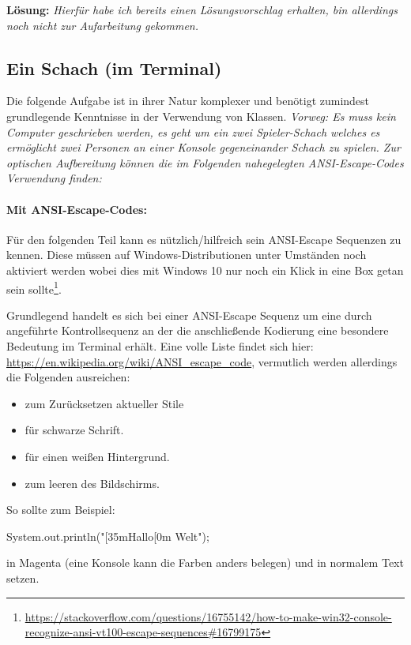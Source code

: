 \documentclass[table]{sopra-base}
\makeatletter
\newenvironment{solution}{\null\par\noindent\textbf{\textcolor{sob@col@uulm@cs}{Lösung:}}\newline\bgroup\color{black}\slshape\ignorespaces}{\egroup}
\makeatother
\begin{document}
\begin{solution}
    Hierfür habe ich bereits einen Lösungsvorschlag erhalten, bin allerdings noch nicht zur Aufarbeitung gekommen.
\end{solution}

\subsection{Ein Schach (im Terminal)}
Die folgende Aufgabe ist in ihrer Natur komplexer und benötigt zumindest grundlegende Kenntnisse in der Verwendung von Klassen. \textit{Vorweg: Es muss kein Computer geschrieben
werden, es geht um ein zwei Spieler-Schach welches es ermöglicht zwei Personen an einer
Konsole gegeneinander Schach zu spielen. Zur optischen Aufbereitung können die im Folgenden nahegelegten ANSI-Escape-Codes Verwendung finden:}\par
\paragraph{Mit ANSI-Escape-Codes:}
Für den folgenden Teil kann es nützlich/hilfreich sein ANSI-Escape Sequenzen zu kennen. Diese müssen auf Windows-Distributionen unter Umständen noch aktiviert werden wobei dies mit Windows 10 nur noch ein Klick in eine Box getan sein sollte\footnote{\url{https://stackoverflow.com/questions/16755142/how-to-make-win32-console-recognize-ansi-vt100-escape-sequences\#16799175}}.\par{}
Grundlegend handelt es sich bei einer ANSI-Escape Sequenz um eine durch \bjava{\\033[}
angeführte Kontrollsequenz an der die anschließende Kodierung eine besondere Bedeutung im
Terminal erhält. Eine volle Liste findet sich hier: \url{https://en.wikipedia.org/wiki/ANSI_escape_code}, vermutlich werden allerdings die Folgenden ausreichen:
\begin{multicols}{2}
    \begin{itemize}
        \item \say{\bjava{\\033[0m}} zum Zurücksetzen aktueller Stile
        \item \say{\bjava{\\033[30m}} für schwarze Schrift.
        \item \say{\bjava{\\033[47m}} für einen weißen Hintergrund.
        \item \say{\bjava{\\033[H\\033[2J}} zum leeren des Bildschirms.
    \end{itemize}
\end{multicols}
So sollte zum Beispiel:
\begin{java*}
System.out.println("[35mHallo[0m Welt");
\end{java*}
 in Magenta (eine Konsole kann die Farben anders belegen) und  in normalem Text setzen.
\end{document}

